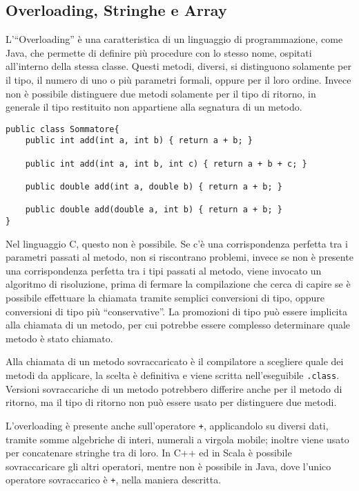 \documentclass{article}
\numberwithin{equation}{subsection}
\begin{document}
\subsection{Overloading, Stringhe e Array}

L'``Overloading'' è una caratteristica di un linguaggio di programmazione, come Java, che permette di definire più procedure con lo stesso nome, ospitati all'interno della stessa 
classe. Questi metodi, diversi, si distinguono solamente per il tipo, il numero di uno o più parametri formali, oppure per il loro ordine. Invece non è possibile distinguere due metodi 
solamente per il tipo di ritorno, in generale il tipo restituito non appartiene alla segnatura di un metodo. 

\begin{verbatim}
public class Sommatore{
    public int add(int a, int b) { return a + b; }

    public int add(int a, int b, int c) { return a + b + c; }

    public double add(int a, double b) { return a + b; }

    public double add(double a, int b) { return a + b; }
}
\end{verbatim}

Nel linguaggio C, questo non è possibile. Se c'è una corrispondenza perfetta tra i parametri passati al metodo, non si riscontrano problemi, invece se non è presente 
una corrispondenza perfetta tra i tipi passati al metodo, viene invocato un algoritmo di risoluzione, prima di fermare la compilazione che cerca di capire se è possibile 
effettuare la chiamata tramite semplici conversioni di tipo, oppure conversioni di tipo più ``conservative''. La promozioni di tipo può essere implicita alla chiamata di un 
metodo, per cui potrebbe essere complesso determinare quale metodo è stato chiamato. 

Alla chiamata di un metodo sovraccaricato è il compilatore a scegliere quale dei metodi da applicare, la scelta è definitiva e viene scritta nell'eseguibile \verb|.class|. 
Versioni sovraccariche di un metodo potrebbero differire anche per il metodo di ritorno, ma il tipo di ritorno non può essere usato per distinguere due metodi. 

L'overloading è presente anche sull'operatore \verb|+|, applicandolo su diversi dati, tramite somme algebriche di interi, numerali a virgola mobile; inoltre viene usato per 
concatenare stringhe tra di loro. In C++ ed in Scala è possibile sovraccaricare gli altri operatori, mentre non è possibile in Java, dove l'unico operatore sovraccarico è \verb|+|, 
nella maniera descritta. 
\end{document}
